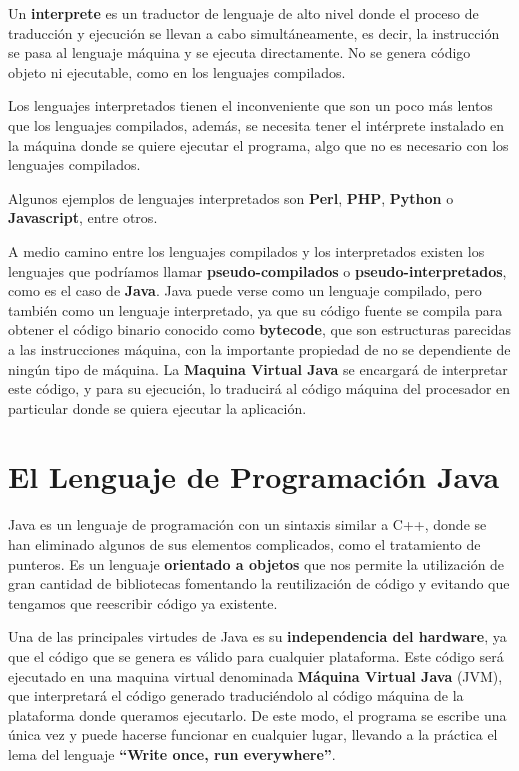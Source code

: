 Un \textbf{interprete} es un traductor de lenguaje de alto nivel donde el proceso de traducción y ejecución se llevan a cabo simultáneamente, es decir, la instrucción se pasa al lenguaje máquina y se ejecuta directamente. No se genera código objeto ni ejecutable, como en los lenguajes compilados.

Los lenguajes interpretados tienen el inconveniente que son un poco más lentos que los lenguajes compilados, además, se necesita tener el intérprete instalado en la máquina donde se quiere ejecutar el programa, algo que no es necesario con los lenguajes compilados.

Algunos ejemplos de lenguajes interpretados son \textbf{Perl}, \textbf{PHP}, \textbf{Python} o \textbf{Javascript}, entre otros.

A medio camino entre los lenguajes compilados y los interpretados existen los lenguajes que podríamos llamar \textbf{pseudo-compilados} o \textbf{pseudo-interpretados}, como es el caso de \textbf{Java}. Java puede verse como un lenguaje compilado, pero también como un lenguaje interpretado, ya que su código fuente se compila para obtener el código binario conocido como \textbf{bytecode}, que son estructuras parecidas a las instrucciones máquina, con la importante propiedad de no se dependiente de ningún tipo de máquina. La \textbf{Maquina Virtual Java} se encargará de interpretar este código, y para su ejecución, lo traducirá al código máquina del procesador en particular donde se quiera ejecutar la aplicación.

\section{El Lenguaje de Programación Java}
Java es un lenguaje de programación con un sintaxis similar a C++, donde se han eliminado algunos de sus elementos complicados, como el tratamiento de punteros. Es un lenguaje \textbf{orientado a objetos} que nos permite la utilización de gran cantidad de bibliotecas fomentando la reutilización de código y evitando que tengamos que reescribir código ya existente.

Una de las principales virtudes de Java es su \textbf{independencia del hardware}, ya que el código que se genera es válido para cualquier plataforma. Este código será ejecutado en una maquina virtual denominada \textbf{Máquina Virtual Java} (JVM), que interpretará el código generado traduciéndolo al código máquina de la plataforma donde queramos ejecutarlo. De este modo, el programa se escribe una única vez y puede hacerse funcionar en cualquier lugar, llevando a la práctica el lema del lenguaje \textbf{``Write once, run everywhere''}.

